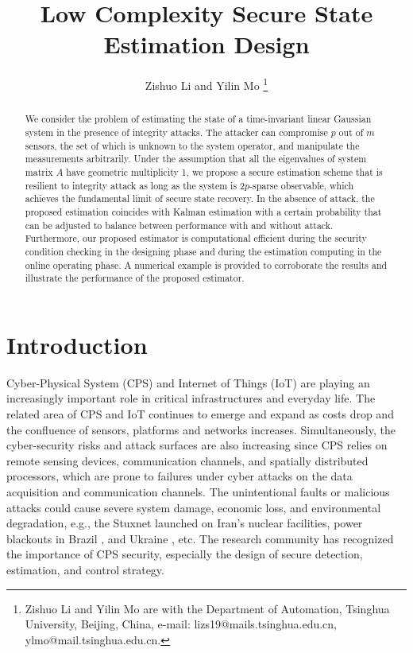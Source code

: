 \documentclass{ieeetrans}   %
\title{\LARGE \bf Low Complexity Secure State Estimation Design}
\author{Zishuo Li and Yilin Mo%
\thanks{Zishuo Li and Yilin Mo are with the Department
	of Automation, Tsinghua University, Beijing, China, e-mail: 
	lizs19@mails.tsinghua.edu.cn, ylmo@mail.tsinghua.edu.cn. }%
}
\begin{document}
\maketitle


\begin{abstract}
We consider the problem of estimating the state of a time-invariant linear Gaussian system in the presence of integrity attacks. The attacker can compromise $p$ out of $m$ sensors, the set of which is unknown to the system operator, and manipulate the measurements arbitrarily. Under the assumption that all the eigenvalues of system matrix $A$ have geometric multiplicity 1, we propose a secure estimation scheme that is resilient to integrity attack as long as the system is $2p$-sparse observable, which achieves the fundamental limit of secure state recovery. In the absence of attack, the proposed estimation coincides with Kalman estimation with a certain probability that can be adjusted to balance between performance with and without attack. Furthermore, our proposed estimator is computational efficient during the security condition checking in the designing phase and during the estimation computing in the online operating phase. A numerical example is provided to corroborate the results and illustrate the performance of the proposed estimator.


\end{abstract}


\section{Introduction}
Cyber-Physical System (CPS) and Internet of Things (IoT) are playing an increasingly important role in critical infrastructures and everyday life. 
The related area of CPS and IoT continues to emerge and expand as costs drop and the confluence of sensors, platforms and networks increases\cite{2018DHS_report}.
Simultaneously, the cyber-security risks and attack surfaces are also increasing \cite{cardenas2008research} since CPS relies on remote sensing devices, communication channels, and spatially distributed processors, which are prone to failures under cyber attacks on the data acquisition and communication channels.
The unintentional faults or malicious attacks could cause severe system damage, economic loss, and environmental degradation, e.g., the Stuxnet launched on Iran’s nuclear facilities\cite{STUXNET}, power blackouts in Brazil \cite{samba_stop}, and Ukraine \cite{Ukraine_Blackout}, etc. The research community has recognized the importance of CPS security, especially the design of secure detection, estimation, and control strategy\cite{cardenas2009challenges}. 
\end{document}
